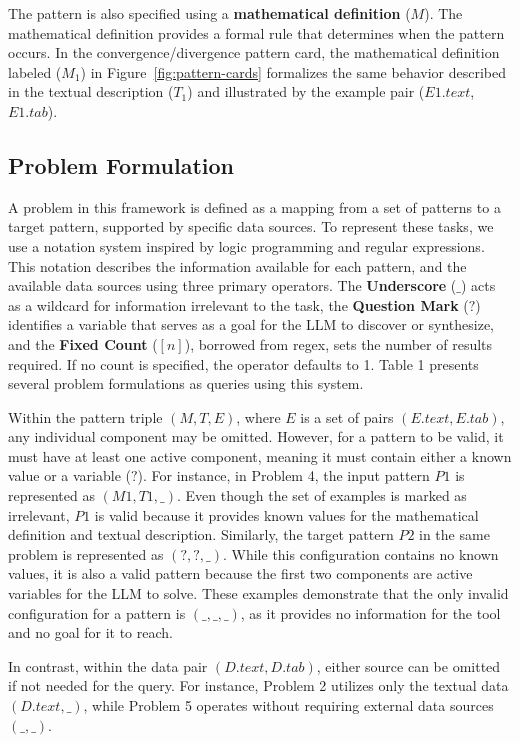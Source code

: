 \documentclass[sigconf,nonacm,anonymous]{acmart}
\begin{document}
The pattern is also specified using a \textbf{mathematical definition} 
($M$). The mathematical definition provides a formal rule that determines 
when the pattern occurs. In the convergence/divergence pattern card, the 
mathematical definition labeled ($M_1$) in Figure~\ref{fig:pattern-cards} 
formalizes the same behavior described in the textual description ($T_1$) 
and illustrated by the example pair ($E1.text$, $E1.tab$).

\subsection{Problem Formulation}
A problem in this framework is defined as a mapping from a set of patterns to a target pattern, supported by specific data sources. To represent these tasks, we use a notation system inspired by logic programming and regular expressions. This notation describes the information available for each pattern, and the available data sources using three primary operators. The \textbf{Underscore} ($\_$) acts as a wildcard for information irrelevant to the task, the \textbf{Question Mark} ($?$) identifies a variable that serves as a goal for the LLM to discover or synthesize, and the \textbf{Fixed Count} ($[n]$), borrowed from regex, sets the number of results required. If no count is specified, the operator defaults to 1. Table 1 presents several problem formulations as queries using this system.

Within the pattern triple $(M, T, E)$, where $E$ is a set of pairs $(E.text, E.tab)$, any individual component may be omitted. However, for a pattern to be valid, it must have at least one active component, meaning it must contain either a known value or a variable ($?$). For instance, in Problem 4, the input pattern $P1$ is represented as $(M1, T1, \_)$. Even though the set of examples is marked as irrelevant, $P1$ is valid because it provides known values for the mathematical definition and textual description. Similarly, the target pattern $P2$ in the same problem is represented as $(?, ?, \_)$. While this configuration contains no known values, it is also a valid pattern because the first two components are active variables for the LLM to solve. These examples demonstrate that the only invalid configuration for a pattern is $(\_,\_,\_)$, as it provides no information for the tool and no goal for it to reach.

In contrast, within the data pair $(D.text, D.tab)$, either source can be omitted if not needed for the query. For instance, Problem 2 utilizes only the textual data $(D.text, \_)$, while Problem 5 operates without requiring external data sources $(\_,\_)$.
\end{document}
